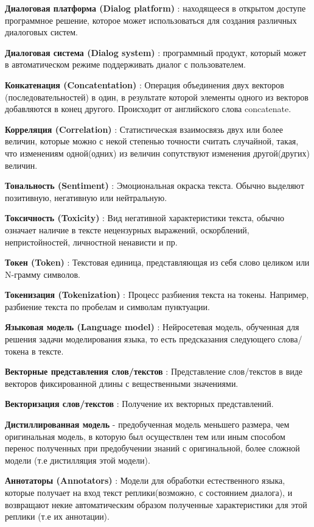 \textbf{Диалоговая платформа (Dialog platform)} : находящееся в открытом доступе программное решение, которое может использоваться для создания различных диалоговых систем.

\textbf{Диалоговая система (Dialog system)} : программный продукт, который может в автоматическом режиме поддерживать диалог с пользователем.

\textbf{Конкатенация (Concatentation)} : Операция объединения двух векторов (последовательностей) в один, в результате которой элементы одного из векторов добавляются в конец другого. Происходит от английского слова concatenate.

\textbf{Корреляция (Correlation)} : Статистическая взаимосвязь двух или более величин, которые можно с некой степенью точности считать случайной, такая, что изменениям одной(одних) из величин сопутствуют изменения другой(других) величин.

\textbf{Тональность (Sentiment)} : Эмоциональная окраска текста. Обычно выделяют позитивную, негативную или нейтральную.

\textbf{Токсичность (Toxicity)} : Вид негативной характеристики текста, обычно означает наличие в тексте нецензурных выражений, оскорблений, непристойностей, личностной ненависти и пр.

\textbf{Токен (Token)} : Текстовая единица, представляющая из себя слово целиком или N-грамму символов.

\textbf{Токенизация (Tokenization)} : Процесс разбиения текста на токены. Например, разбиение текста по пробелам и символам пунктуации.

\textbf{Языковая модель (Language model)} : Нейросетевая модель, обученная для решения задачи моделирования языка, то есть предсказания следующего слова/токена в тексте.

\textbf{Векторные представления слов/текстов} : Представление слов/текстов в виде векторов фиксированной длины с вещественными значениями.

\textbf{Векторизация слов/текстов} : Получение их векторных представлений. 

\textbf{Дистиллированная модель} - предобученная модель меньшего размера, чем оригинальная модель, в которую был осуществлен тем или иным способом перенос полученных при предобучении знаний с оригинальной, более сложной модели (т.е дистилляция этой модели).

\textbf{Аннотаторы (Annotators)} : Модели для обработки естественного языка, которые получает на вход текст реплики(возможно, с состоянием диалога), и возвращают некие автоматическим образом полученные характеристики для этой реплики (т.е их аннотации). 

